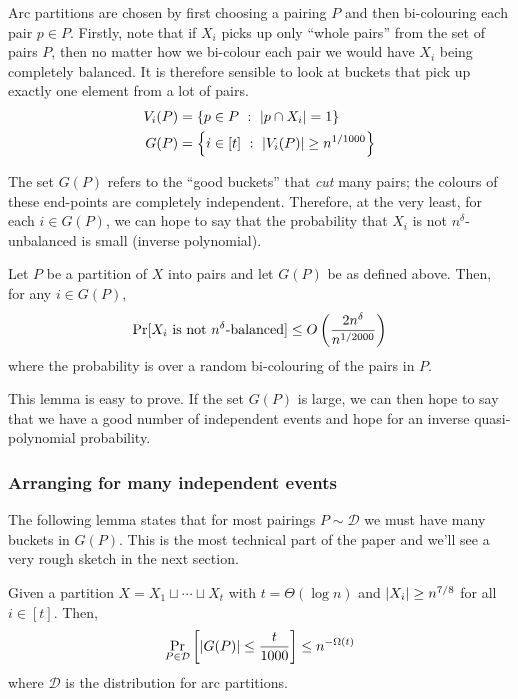 Arc partitions are chosen by first choosing a pairing $P$ and then bi-colouring each pair $p \in P$.
Firstly, note that if $X_i$ picks up only ``whole pairs'' from the set of pairs $P$, then no matter how we bi-colour each pair we would have $X_i$ being completely balanced.
It is therefore sensible to look at buckets that pick up exactly one element from a lot of pairs.
\begin{align*}
	 V_i(P) &= \left\{{ p \in P}\ : \ {\left| p \cap X_i \right| = 1 }\right\}\\
	G(P) &= \left\{{ i \in [t]}\ : \ {\left| V_i(P) \right| \geq n^{1/1000} }\right\}
\end{align*}

The set $G(P)$ refers to the ``good buckets'' that \emph{cut} many pairs; the colours of these end-points are completely independent.
Therefore, at the very least, for each $i \in G(P)$, we can hope to say that the probability that $X_i$ is not $n^{\delta}$-unbalanced is small (inverse polynomial).

\begin{lemma}
  \label{lem:MLSep:bound-for-good-buckets}
  Let $P$ be a partition of $X$ into pairs and let $G(P)$ be as defined above. 
  Then, for any $i \in G(P)$,
  \[
    \Pr[ \text{$X_i$ is not $n^{\delta}$-balanced} ] \leq O\left(\frac{2n^{\delta}}{n^{1/2000}}\right)
  \]
  where the probability is over a random bi-colouring of the pairs in $P$. 
\end{lemma}

This lemma is easy to prove.
If the set $G(P)$ is large, we can then hope to say that we have a good number of independent events and hope for an inverse quasi-polynomial probability.

\subsubsection*{Arranging for many independent events}

The following lemma states that for most pairings $P \sim \mathcal{D}$ we must have many buckets in $G(P)$.
This is the most technical part of the paper and we'll see a very rough sketch in the next section.

\begin{lemma}
\label{lem:manyBucketsWithCuts}
Given a partition $X = X_1 \sqcup \cdots \sqcup X_t$ with $t = \Theta(\log n)$ and $\left|X_i\right| \geq n^{7/8}$ for all $i \in [t]$. Then,
\[
 \Pr_{P \in \mathcal{D}} \left[ \left|G(P)\right| \leq \frac{t}{1000} \right] \leq n^{- \Omega(t)}
\]
where $\mathcal{D}$ is the distribution for arc partitions.
\end{lemma}

